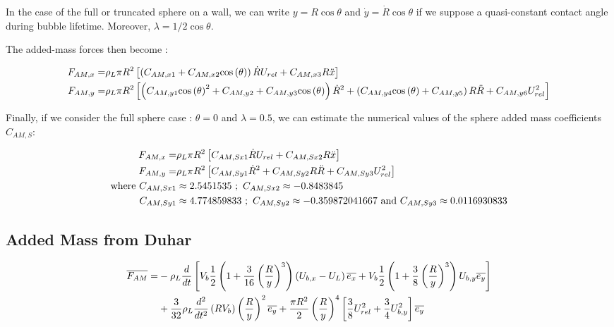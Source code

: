 \npar

In the case of the full or truncated sphere on a wall, we can write $y=R\cos{\theta}$ and $\dot{y}=\dot{R}\cos{\theta}$ if we suppose a quasi-constant contact angle during bubble lifetime. Moreover, $\lambda=1/2\cos{\theta}$. 

The added-mass forces then become :

\begin{align}
F_{AM,x}=&\rho_{L}\pi R^{2}\left[ \left( C_{AM,x1}+C_{AM,x2}\mathrm{cos}\left( \theta \right) \right)\dot{R}U_{rel}+C_{AM,x3}R\ddot{x} \right]\\
F_{AM,y}=&\rho_{L}\pi R^{2}\left[ \left( C_{AM,y1}\mathrm{cos}\left( \theta \right)^{2}+C_{AM,y2} + C_{AM,y3}\mathrm{cos}\left( \theta \right) \right)\dot{R}^{2}+\left( C_{AM,y4}\mathrm{cos}\left( \theta \right)+ C_{AM,y5} \right)R\ddot{R}+C_{AM,y6}U_{rel}^{2} \right]
\end{align}

\npar

Finally, if we consider the full sphere case : $\theta=0$ and $\lambda=0.5$, we can estimate the numerical values of the sphere added mass coefficients $C_{AM,S}$:

\begin{align}
F_{AM,x}=&\rho_{L}\pi R^{2}\left[ C_{AM,Sx1}\dot{R}U_{rel}+C_{AM,Sx2}R\ddot{x} \right]\\
F_{AM,y}=&\rho_{L}\pi R^{2}\left[ C_{AM,Sy1}\dot{R}^{2}+C_{AM,Sy2}R\ddot{R}+C_{AM,Sy3}U_{rel}^{2} \right]\\
\nonumber \text{where}\ C_{AM,Sx1}&\approx 2.5451535\ ;\ C_{AM,Sx2}\approx-0.8483845 \\
\nonumber C_{AM,Sy1}& \approx 4.774859833 \ ; \ C_{AM,Sy2}\approx -0.359872041667\ \text{and}\ C_{AM,Sy3}\approx 0.0116930833
\end{align}


\subsection{Added Mass from Duhar \etal}

\begin{align}
\vect{F_{AM}}=&-\rho_{L}\frac{d}{dt}\crocht{V_{b}\frac{1}{2}\parth{1+\frac{3}{16}\parth{\frac{R}{y}}^{3} } \parth{U_{b,x}-U_{L}} \vect{e_{x}} + V_{b}\frac{1}{2}\parth{1+\frac{3}{8} \parth{\frac{R}{y}}^{3} }U_{b,y}\vect{e_{y}} }\\
%
&+ \frac{3}{32}\rho_{L}\frac{d^{2}}{dt^{2}}\parth{RV_{b}} \parth{\frac{R}{y}}^{2}\vect{e_{y}} + \frac{\pi R^{2}}{2} \parth{\frac{R}{y}}^{4} \crocht{\frac{3}{8}U_{rel}^{2}+\frac{3}{4}U_{b,y}^{2}}\vect{e_{y}}
\end{align}

